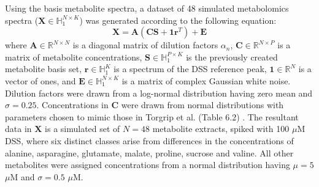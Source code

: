 \begin{doublespace}
Using the basis metabolite spectra, a dataset of 48 simulated metabolomics
spectra ($\mathbf{X} \in \mathbb{H}_1^{N \times K}$) was generated according
to the following equation:
\begin{equation}
\mathbf{X}
 = \mathbf{A} \left( \mathbf{C} \mathbf{S} + \mathbf{1} \mathbf{r}^T \right)
 + \mathbf{E}
\end{equation}
where $\mathbf{A} \in \mathbb{R}^{N \times N}$ is a diagonal matrix of dilution
factors $\alpha_n$, $\mathbf{C} \in \mathbb{R}^{N \times P}$ is a matrix of
metabolite concentrations, $\mathbf{S} \in \mathbb{H}_1^{P \times K}$ is the
previously created metabolite basis set, $\mathbf{r} \in \mathbb{H}_1^K$ is a
spectrum of the DSS reference peak, $\mathbf{1} \in \mathbb{R}^N$ is a vector
of ones, and $\mathbf{E} \in \mathbb{H}_1^{N \times K}$ is a matrix of complex
Gaussian white noise. Dilution factors were drawn from a log-normal
distribution having zero mean and $\sigma = 0.25$. Concentrations in
$\mathbf{C}$ were drawn from normal distributions with parameters chosen to
mimic those in Torgrip et al. (Table 6.2) \cite{torgrip:metab2008}. The
resultant data in $\mathbf{X}$ is a simulated set of $N = 48$ metabolite
extracts, spiked with 100 $\mu$M DSS, where six distinct classes arise from
differences in the concentrations of alanine, asparagine, glutamate, malate,
proline, sucrose and valine. All other metabolites were assigned concentrations
from a normal distribution having $\mu = 5$ $\mu$M and $\sigma = 0.5$ $\mu$M.
\end{doublespace}


